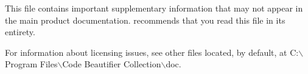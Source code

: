 \newpage

\begin{flushleft}
This file contains important supplementary information that may not appear in the main product documentation. \lextm recommends that you read this file in its entirety.

For information about licensing issues, see other files located, by default, at C:$\backslash$Program Files$\backslash$Code Beautifier Collection$\backslash$doc.

\end{flushleft}